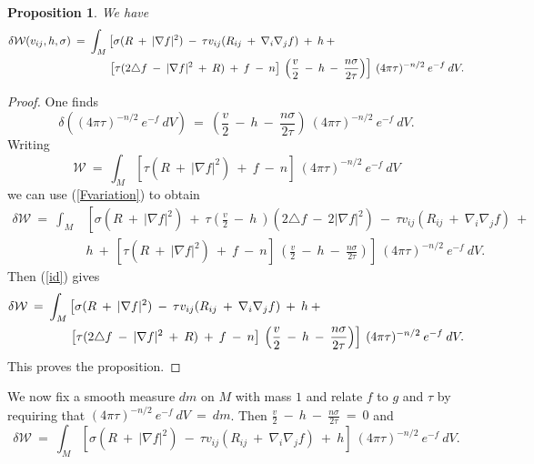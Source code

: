\documentclass[12pt]{amsart}
\numberwithin{equation}{section}
\theoremstyle{plain}
\newtheorem{proposition}[equation]{Proposition}
\theoremstyle{definition}
\theoremstyle{remark}
\begin{document}
\begin{proposition}
We have
\begin{align}
\delta {\mathcal W}(v_{ij}, h, \sigma) \: = \:
\int_M & \left[ \sigma  (R \: + \: |\nabla f|^2) \:
- \: \tau v_{ij} (R_{ij} \: + \: \nabla_i \nabla_j f) \: + \: h \: +
\right.  \\
& \left.
\left[ \tau (2 \triangle f \: - \: |\nabla f|^2 \: + \: R) \: + \: f
\: - \: n \right] \:  
\left( \frac{v}{2} \: - \: h \: - \: \frac{n\sigma}{2\tau} \right) \right] \:
(4 \pi \tau)^{-n/2} \: e^{-f} \: dV. \notag
\end{align}
\end{proposition}
\begin{proof}
One finds
\begin{equation}
\delta \left( (4 \pi \tau)^{-n/2} \: e^{-f} \: dV \right) \: = \:
\left( \frac{v}{2} \: - \: h \: - \: \frac{n\sigma}{2\tau} \right) \:
(4 \pi \tau)^{-n/2} \: e^{-f} \: dV.
\end{equation}
Writing
\begin{equation}
{\mathcal W} \: = \: \int_M \left[ \tau (R \: + \: |\nabla f|^2) \: + \: f
\: - \: n \right] \: (4 \pi \tau)^{-n/2} \: e^{-f} \: dV
\end{equation}
we can use 
(\ref{Fvariation}) to obtain
\begin{align}
\delta {\mathcal W} \: = \:
\int_M & \left[ \sigma  (R \: + \: |\nabla f|^2) \: + \:
\tau  \left( \frac{v}{2} \:  - \: h \: \right) (2 \triangle f \: - \:
2|\nabla f|^2) \: - \: \tau v_{ij} (R_{ij} \: + \: \nabla_i \nabla_j f) \: +
\right. \\
& \left. h \: + \:
\left[ \tau (R \: + \: |\nabla f|^2) \: + \: f
\: - \: n \right] \:  
\left( \frac{v}{2} \: - \: h \: - \: \frac{n\sigma}{2\tau} \right) \right] \:
(4 \pi \tau)^{-n/2} \: e^{-f} \: dV.
\end{align}
Then (\ref{id}) gives
\begin{align}
\delta {\mathcal W} \:
= \:
\int_M & \left[ \sigma  (R \: + \: |\nabla f|^2) \:
- \: \tau v_{ij} (R_{ij} \: + \: \nabla_i \nabla_j f) \: + \: h \: +
\right. \\
& \left.
\left[ \tau (2 \triangle f \: - \: |\nabla f|^2 \: + \: R) \: + \: f
\: - \: n \right] \:  
\left( \frac{v}{2} \: - \: h \: - \: \frac{n\sigma}{2\tau} \right) \right] \:
(4 \pi \tau)^{-n/2} \: e^{-f} \: dV. \notag
\end{align}
This proves the proposition.
\end{proof}

We now fix a smooth measure $dm$ on $M$ with mass $1$ and
relate $f$ to $g$ and $\tau$ by
requiring that $(4 \pi \tau)^{-n/2} \: e^{-f} \: dV \: =\: dm$. Then
$\frac{v}{2} \: - \: h \: - \: \frac{n\sigma}{2\tau} \: = \: 0$ and
\begin{equation} \label{Wvar}
\delta {\mathcal W} \: = \: \int_M  \left[ \sigma  (R \: + \: |\nabla f|^2) \:
- \: \tau v_{ij} (R_{ij} \: + \: \nabla_i \nabla_j f) \: + \: h \right] \:
(4 \pi \tau)^{-n/2} \: e^{-f} \: dV.
\end{equation}
\end{document}
